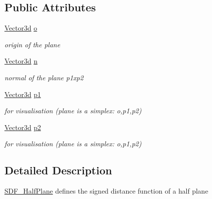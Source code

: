 \subsection*{Public Attributes}
\begin{DoxyCompactItemize}
\item 
\mbox{\label{classCPlantBox_1_1SDF__HalfPlane_a9546987ce3f185224ca97c5b3aebe0d3}} 
\hyperlink{classCPlantBox_1_1Vector3d}{Vector3d} \hyperlink{classCPlantBox_1_1SDF__HalfPlane_a9546987ce3f185224ca97c5b3aebe0d3}{o}
\begin{DoxyCompactList}\small\item\em origin of the plane \end{DoxyCompactList}\item 
\mbox{\label{classCPlantBox_1_1SDF__HalfPlane_ade3114729569e8f5b1003cc923f7dc91}} 
\hyperlink{classCPlantBox_1_1Vector3d}{Vector3d} \hyperlink{classCPlantBox_1_1SDF__HalfPlane_ade3114729569e8f5b1003cc923f7dc91}{n}
\begin{DoxyCompactList}\small\item\em normal of the plane p1xp2 \end{DoxyCompactList}\item 
\mbox{\label{classCPlantBox_1_1SDF__HalfPlane_a60299a78ce8dad5494ef4a3a85997d04}} 
\hyperlink{classCPlantBox_1_1Vector3d}{Vector3d} \hyperlink{classCPlantBox_1_1SDF__HalfPlane_a60299a78ce8dad5494ef4a3a85997d04}{p1}
\begin{DoxyCompactList}\small\item\em for visualisation (plane is a simplex\+: o,p1,p2) \end{DoxyCompactList}\item 
\mbox{\label{classCPlantBox_1_1SDF__HalfPlane_a4022071d0f9f9531db0565ffb9a4f661}} 
\hyperlink{classCPlantBox_1_1Vector3d}{Vector3d} \hyperlink{classCPlantBox_1_1SDF__HalfPlane_a4022071d0f9f9531db0565ffb9a4f661}{p2}
\begin{DoxyCompactList}\small\item\em for visualisation (plane is a simplex\+: o,p1,p2) \end{DoxyCompactList}\end{DoxyCompactItemize}


\subsection{Detailed Description}
\hyperlink{classCPlantBox_1_1SDF__HalfPlane}{S\+D\+F\+\_\+\+Half\+Plane} defines the signed distance function of a half plane 

